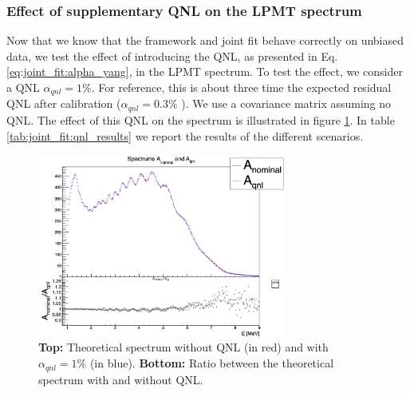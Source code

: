 \documentclass[../main.tex]{subfiles}
\begin{document}
\subsubsection{Effect of supplementary QNL on the LPMT spectrum}

Now that we know that the framework and joint fit behave correctly on unbiased data, we test the effect of introducing the QNL, as presented in Eq. \ref{eq:joint_fit:alpha_yang}, in the LPMT spectrum. To test the effect, we consider a QNL $\alpha_{qnl} = 1\%$. For reference, this is about three time the expected residual QNL after calibration ($\alpha_{qnl} = 0.3\%$ \cite{juno_collaboration_calibration_2021}). We use a covariance matrix assuming no QNL. The effect of this QNL on the spectrum is illustrated in figure \ref{fig:joint_fit:anom_aqnl}. In table \ref{tab:joint_fit:qnl_results} we report the results of the different scenarios.

\begin{figure}[ht]
  \centering
  \includegraphics[height=6cm]{images/joint_fit/AnominalAQNL.png}
  \caption{\textbf{Top:} Theoretical spectrum without QNL (in red) and with $\alpha_{qnl} = 1\%$ (in blue). \textbf{Bottom:} Ratio between the theoretical spectrum with and without QNL.}
  \label{fig:joint_fit:anom_aqnl}
\end{figure}
\end{document}
